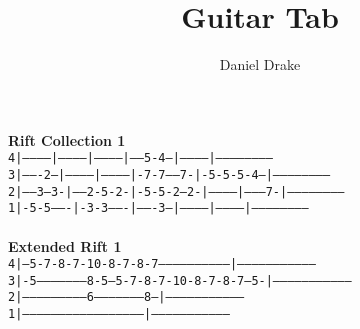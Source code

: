 \documentclass[12pt]{extarticle}
\title{Guitar Tab}
\author{Daniel Drake}
\def\code#1{\texttt{#1}}
\begin{document}
\maketitle
\noindent
\textbf{Rift Collection 1} \\
\code{4|-----------|-----------|-----------|-----5-4---|-----------|------------------------}\\
\code{3|-------2---|-----------|-----------|-7-7-----7-|-5-5-5-4---|------------------------}\\
\code{2|-----3---3-|-----2-5-2-|-5-5-2---2-|-----------|---------7-|------------------------}\\
\code{1|-5-5-------|-3-3-------|-------3---|-----------|-----------|------------------------}\\ \\
\textbf{Extended Rift 1} \\
\code{4|---5-7-8-7-10-8-7-8-7------------------------------|---------------------------------}\\
\code{3|-5--------------------8-5---5-7-8-7-10-8-7-8-7---5-|---------------------------------}\\
\code{2|--------------------------6--------------------8---|--------------------------------}\\
\code{1|---------------------------------------------------|--------------------------------}\\
\end{document}
